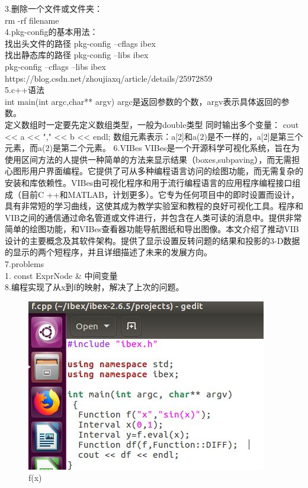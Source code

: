 \documentclass[UTF8]{ctexart}
\begin{document}
3.删除一个文件或文件夹：\\
rm -rf filename\\
4.pkg-config的基本用法：\\
找出头文件的路径 pkg-config --cflags ibex\\
找出静态库的路径 pkg-config --libs ibex\\
pkg-config --cflags --libs ibex\\
https://blog.csdn.net/zhoujiaxq/article/details/25972859\\
5.c++语法\\
int main(int argc,char** argv)  argc是返回参数的个数，argv表示具体返回的参数。\\
定义数组时一定要先定义数组类型，一般为double类型
同时输出多个变量： cout << a << "," << b << endl;
数组元素表示：a[2]和a(2)是不一样的，a[2]是第三个元素，而a(2)是第二个元素。
6.VIBes
VIBes是一个开源科学可视化系统，旨在为使用区间方法的人提供一种简单的方法来显示结果（boxes,subpaving），而无需担心图形用户界面编程。它提供了可从多种编程语言访问的绘图功能，而无需复杂的安装和库依赖性。VIBes由可视化程序和用于流行编程语言的应用程序编程接口组成（目前C ++和MATLAB，计划更多）。它专为任何项目中的即时设置而设计，具有非常短的学习曲线，这使其成为教学实验室和教程的良好可视化工具。程序和VIB之间的通信通过命名管道或文件进行，并包含在人类可读的消息中。提供非常简单的绘图功能，和VIBes查看器功能导航图纸和导出图像。本文介绍了推动VIB设计的主要概念及其软件架构。提供了显示设置反转问题的结果和投影的3-D数据的显示的两个短程序，并且详细描述了未来的发展方向。\\
7.problems\\
1. const ExprNode $\&$  中间变量\\
8.编程实现了从x到f的映射，解决了上次的问题。\\
\begin{figure}
  \includegraphics[width=.8\linewidth]{eval.JPG}
  \caption{f(x)}
  \label{fig:boat1}
\end{figure}
\end{document}
